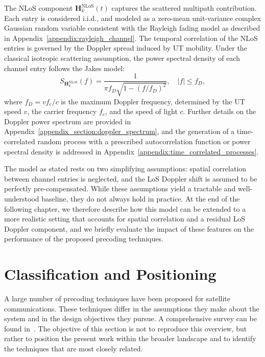 The \ac{NLoS} component $\mathbf{H}_k^{\mathrm{NLoS}}(t)$ captures the scattered multipath contribution.
Each entry is considered \ac{i.i.d.}, and modeled as a zero-mean unit-variance complex Gaussian random variable consistent with the Rayleigh fading model as described in Appendix~\ref{appendix:rayleigh_channel}. 
The temporal correlation of the \ac{NLoS} entries is governed by the Doppler spread induced by \ac{UT} mobility.
Under the classical isotropic scattering assumption, the power spectral density of each channel entry follows the Jakes model:
\begin{equation}
\label{eq:jakes_doppler_spectrum}
    S_{\mathbf{H}_k^{\mathrm{NLoS}}}(f) = \frac{1}{\pi f_D \sqrt{1 - (f/f_D)^2}}, \quad |f| \leq f_D,
\end{equation}
where $f_D = v f_c / c$ is the maximum Doppler frequency, determined by the \ac{UT} speed $v$, the carrier frequency $f_c$, and the speed of light $c$. 
Further details on the Doppler power spectrum are provided in Appendix~\ref{appendix_section:doppler_spectrum}, and the generation of a time-correlated random process with a prescribed autocorrelation function or power spectral density is addressed in Appendix~\ref{appendix:time_correlated_processes}.

The model as stated rests on two simplifying assumptions: spatial correlation between channel entries is neglected, and the \ac{LoS} Doppler shift is assumed to be perfectly pre-compensated.
While these assumptions yield a tractable and well-understood baseline, they do not always hold in practice.
At the end of the following chapter, we therefore describe how this model can be extended to a more realistic setting that accounts for spatial correlation and a residual \ac{LoS} Doppler component, and we briefly evaluate the impact of these features on the performance of the proposed precoding techniques.


\section{Classification and Positioning}
\label{section:hts_classification_and_positioning}

A large number of precoding techniques have been proposed for satellite communications. These techniques differ in the assumptions they make about the system and in the design objectives they pursue. A comprehensive survey can be found in~\cite{3_precoding_for_satellites_survey}. The objective of this section is not to reproduce this overview, but rather to position the present work within the broader landscape and to identify the techniques that are most closely related.

